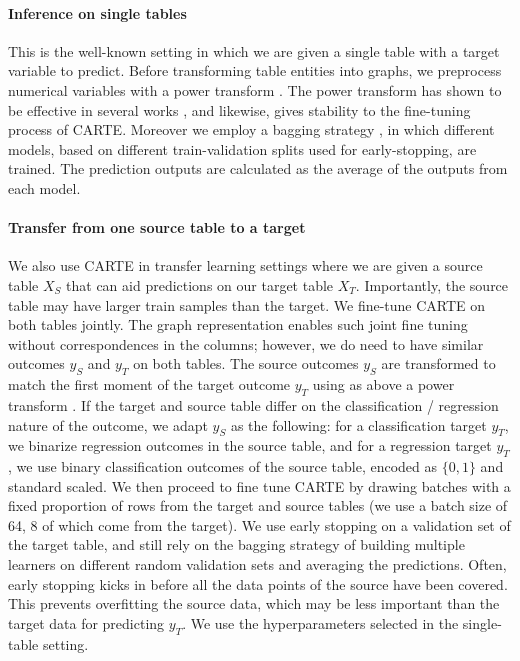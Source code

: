 \documentclass{article}
\theoremstyle{plain}
\theoremstyle{definition}
\theoremstyle{remark}
\begin{document}
\paragraph{Inference on single tables} This is the well-known setting in which we are given a single table with a target variable to predict. Before transforming table entities into graphs, we preprocess numerical variables with a power transform \citep{yeo2000new}. The power transform has shown to be effective in several works \citep[\emph{e.g.,}][]{hollmannTabPFNTransformerThat2023, cvetkov2023relational}, and likewise, gives stability to the fine-tuning process of CARTE. Moreover we employ a bagging strategy \citep{breiman1996bagging}, in which different models, based on different train-validation splits used for early-stopping, are trained. The prediction outputs are calculated as the average of the outputs from each model.

\paragraph{Transfer from one source table to a target} We also use CARTE in transfer learning settings where we are given a source table $X_S$ that can aid predictions on our target table $X_T$. Importantly, the source table may have larger train samples than the target. We fine-tune CARTE on both tables jointly. The graph representation enables such joint fine tuning without correspondences in the columns; however, we do need to have similar outcomes $y_S$ and $y_T$ on both tables. The source outcomes $y_S$ are transformed to match the first moment of the target outcome $y_T$ using as above a power transform \citep[note that here we use the inverse transform]{yeo2000new}. If the target and source table differ on the classification / regression nature of the outcome, we adapt $y_S$ as the following: for a classification target $y_T$, we binarize regression outcomes in the source table, and for a regression target $y_T$, we use binary classification outcomes of the source table, encoded as $\{0, 1\}$ and standard scaled. We then proceed to fine tune CARTE by drawing batches with a fixed proportion of rows from the target and source tables (we use a batch size of 64, 8 of which come from the target). We use early stopping on a validation set of the target table, and still rely on the bagging strategy of building multiple learners on different random validation sets and averaging the predictions. Often, early stopping kicks in before all the data points of the source have been covered. This prevents overfitting the source data, which may be less important than the target data for predicting $y_T$. We use the hyperparameters selected in the single-table setting.
\end{document}
